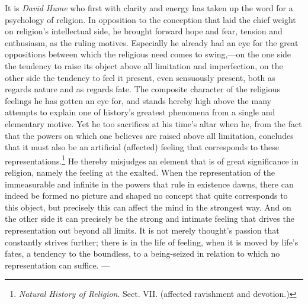 \documentclass[12pt,a4paper]{book}
\begin{document}
It is \emph{David Hume} who first with clarity and energy has taken up the word for a psychology of
religion. In opposition to the conception that laid the chief weight on religion's intellectual side, he
brought forward hope and fear, tension and enthusiasm, as the ruling motives. Especially he already had
an eye for the great oppositions between which the religious need comes to swing,---on the one side the
tendency to raise its object above all limitation and imperfection, on the other side the tendency to
feel it present, even sensuously present, both as regards nature and as regards fate. The composite
character of the religious feelings he has gotten an eye for, and stands hereby high above the many
attempts to explain one of history's greatest phenomena from a single and elementary motive. Yet he too
sacrifices at his time's altar when he, from the fact that the powers on which one believes are raised
above all limitation, concludes that it must also be an artificial (affected) feeling that corresponds
to these representations.\footnote{\emph{Natural History of Religion}. Sect. VII. (affected ravishment
and devotion.)} He thereby misjudges an element that is of great significance in religion, namely the
feeling at the exalted. When the representation of the immeasurable and infinite in the powers that
rule in existence dawns, there can indeed be formed no picture and shaped no concept that quite
corresponds to this object, but precisely this can affect the mind in the strongest way. And on the
other side it can precisely be the strong and intimate feeling that drives the representation out beyond
all limits. It is not merely thought's passion that constantly strives further; there is in the life of
feeling, when it is moved by life's fates, a tendency to the boundless, to a being-seized in relation
to which no representation can suffice. ---
\end{document}
